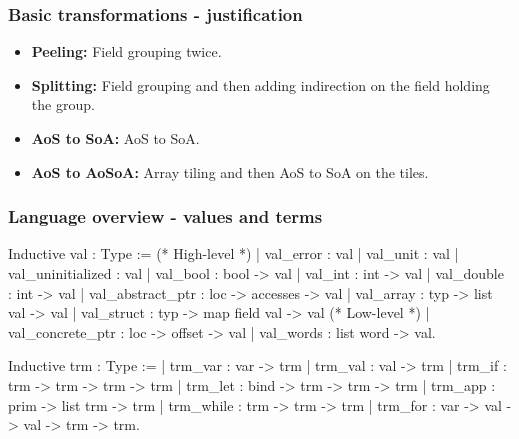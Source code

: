 \begin{frame}[fragile]
\frametitle{Basic transformations - justification}

\begin{itemize}
	\setlength\itemsep{1.5em}
	\item \textbf{Peeling:} Field grouping twice.
	\item \textbf{Splitting:} Field grouping and then adding indirection on the field holding the group.
	\item \textbf{AoS to SoA:} AoS to SoA.
	\item \textbf{AoS to AoSoA:} Array tiling and then AoS to SoA on the tiles.
\end{itemize}

\end{frame}


\begin{frame}[fragile]
\frametitle{Language overview - values and terms}

\begin{coqs}
Inductive val : Type :=
  (* High-level *)
  | val_error : val
  | val_unit : val
  | val_uninitialized : val
  | val_bool : bool -> val
  | val_int : int -> val
  | val_double : int -> val
  | val_abstract_ptr : loc -> accesses -> val
  | val_array : typ -> list val -> val
  | val_struct : typ -> map field val -> val
  (* Low-level *)
  | val_concrete_ptr : loc -> offset -> val
  | val_words : list word -> val.
\end{coqs}

\begin{coqs}
Inductive trm : Type :=
  | trm_var : var -> trm
  | trm_val : val -> trm
  | trm_if : trm -> trm -> trm -> trm
  | trm_let : bind -> trm -> trm -> trm
  | trm_app : prim -> list trm -> trm
  | trm_while : trm -> trm -> trm
  | trm_for : var -> val -> val -> trm -> trm.
\end{coqs}

\end{frame}


